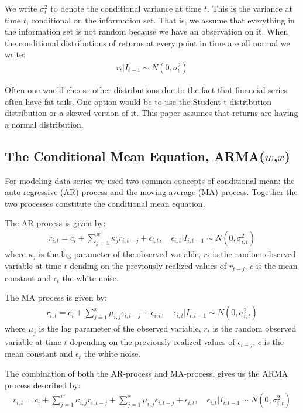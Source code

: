 We write $\sigma_t^2$ to denote the conditional variance at time $t$. This is the variance at time $t$, conditional on the information set. That is, we assume that everything in the information set is not random because we have an observation on it. When the conditional distributions of returns at every point in time are all normal we write:
\begin{align}
    r_t | I_{t-1} \sim N(0,{\sigma_t^2})
\end{align}

Often one would choose other distributions due to the fact that financial
series often have fat tails. One option would be to use the Student-t
distribution distribution or a skewed version of it. This paper assumes that returns are having a normal distribution. 

\subsection*{The Conditional Mean Equation, ARMA($w$,$x$)}

For modeling data series we used two common concepts of conditional mean: the auto regressive (AR) process and the moving average (MA) process. Together the two processes constitute the conditional mean equation. 

The AR process is given by:
\begin{align}
    r_{i,t}=c_i + \sum_{j=1}^w\kappa_j r_{i,t-j} + \epsilon_{i,t},\quad \epsilon_{i,t} | I_{i,t-1} \sim N(0,{\sigma_{i,t}^2}) \label{ConditionalMeanEquation}
\end{align}
where $\kappa_j$ is the lag parameter of the observed variable, $r_t$ is the random observed variable at time $t$ dending on the previously realized values of $r_{t-j}$, $c$ is the mean constant and $\epsilon_t$ the white noise.

The MA process is given by:
\begin{align}
    r_{i,t}=c_i + \sum_{j=1}^x\mu_{i,j} \epsilon_{i,t-j} + \epsilon_{i,t},\quad \epsilon_{i,t} | I_{i,t-1} \sim N(0,{\sigma_{i,t}^2}) \label{ConditionalMeanEquation}
\end{align}
where $\mu_j$ is the lag parameter of the observed variable, $r_t$ is the random observed variable at time $t$ depending on the previously realized values of $\epsilon_{t-j}$, $c$ is the mean constant and $\epsilon_t$ the white noise.

The combination of both the AR-process and MA-process, gives us the ARMA process described by:
\begin{align}
    r_{i,t}=c_i+\sum_{j=1}^w\kappa_{i,j} r_{i,t-j}+\sum_{j=1}^x\mu_{i,j} \epsilon_{i,t-j}+\epsilon_{i,t},\quad \epsilon_{i,t} | I_{i,t-1} \sim N(0,{\sigma_{i,t}^2}) \label{ConditionalMeanEquation}
\end{align}

